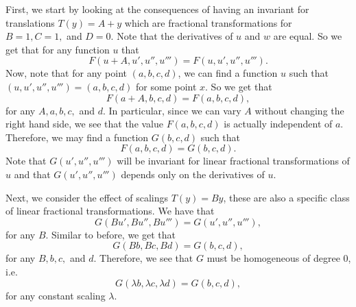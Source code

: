 First, we start by looking at the consequences of having an invariant for translations \(T(y) = A + y\) which
are fractional transformations for \(B = 1, C = 1,\) and \(D = 0\). Note that the derivatives of \(u\) and \(w\)
are equal. So we get that for any function \(u\) that
\begin{equation}
F(u + A, u', u'', u''') = F(u, u', u'', u''').
\end{equation}
Now, note that for any point \((a, b, c, d)\), we can find a function \(u\) such that 
\((u, u', u'', u''') = (a,b,c,d)\) for some point \(x\). So we get that
\begin{equation}
F(a + A, b, c, d) = F(a, b, c, d),
\end{equation} 
for any \(A, a, b, c,\) and \(d\). In particular, since we can vary \(A\) without changing the right
hand side, we see that the value \(F(a, b, c, d)\) is actually independent of \(a\). Therefore, we
may find a function \(G(b, c, d)\) such that
\begin{equation}
F(a, b, c, d) = G(b, c, d).
\end{equation}
Note that \(G(u', u'', u''')\) will be invariant for linear fractional transformations of \(u\) and 
that \(G(u', u'', u''')\) depends only on the derivatives of \(u\).

Next, we consider the effect of scalings \(T(y) = By\), these are also a specific class of linear fractional
transformations. We have that
\begin{equation}
G(Bu', Bu'', Bu''') = G(u', u'', u'''),
\end{equation}
for any \(B\). Similar to before, we get that
\begin{equation}
G(Bb, Bc, Bd) = G(b, c, d),
\end{equation}
for any \(B, b, c,\) and \(d\). Therefore, we see that \(G\) must be homogeneous of degree 0, i.e.
\begin{equation}
G(\lambda b, \lambda c, \lambda d) = G(b, c, d),
\end{equation}
for any constant scaling \(\lambda\).

